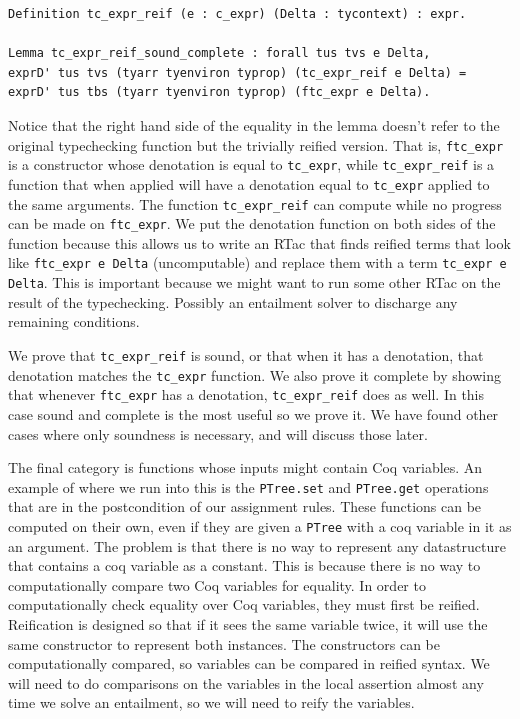 \documentclass{puthesis}
\begin{document}
\begin{lstlisting}
Definition tc_expr_reif (e : c_expr) (Delta : tycontext) : expr.

Lemma tc_expr_reif_sound_complete : forall tus tvs e Delta,
exprD' tus tvs (tyarr tyenviron typrop) (tc_expr_reif e Delta) =
exprD' tus tbs (tyarr tyenviron typrop) (ftc_expr e Delta).
\end{lstlisting}

Notice that the right hand side of the equality in the lemma doesn't
refer to the original typechecking function but the trivially reified
version. That is, \lstinline|ftc_expr| is a constructor whose
denotation is equal to \lstinline|tc_expr|, while
\lstinline|tc_expr_reif| is a function that when applied will have a
denotation equal to \lstinline|tc_expr| applied to the same
arguments. The function \lstinline|tc_expr_reif| can compute while no
progress can be made on \lstinline|ftc_expr|.  We put the denotation
function on both sides of the function because this allows us to write
an RTac that finds reified terms that look like \lstinline|ftc_expr e Delta|
(uncomputable) and replace them with a term 
\lstinline|tc_expr e Delta|. This is important because we might want to run some other
RTac on the result of the typechecking. Possibly an entailment solver
to discharge any remaining conditions.

We prove that \lstinline|tc_expr_reif| is sound, or that when it has a
denotation, that denotation matches the \lstinline|tc_expr|
function. We also prove it complete by showing that whenever
\lstinline|ftc_expr| has a denotation, \lstinline|tc_expr_reif| does
as well.  In this case sound and complete is the most useful so we
prove it. We have found other cases where only soundness is necessary,
and will discuss those later.

The final category is functions whose inputs might contain Coq
variables. An example of where we run into this is the
\lstinline|PTree.set| and \lstinline|PTree.get| operations that are in
the postcondition of our assignment rules. These functions can be
computed on their own, even if they are given a \lstinline|PTree| with
a coq variable in it as an argument. The problem is that there is no
way to represent any datastructure that contains a coq variable as a
constant. This is because there is no way to computationally compare
two Coq variables for equality. In order to computationally check
equality over Coq variables, they must first be reified.  Reification
is designed so that if it sees the same variable twice, it will use
the same constructor to represent both instances. The constructors can
be computationally compared, so variables can be compared in reified
syntax.  We will need to do comparisons on the variables in the local
assertion almost any time we solve an entailment, so we will need to
reify the variables.
\end{document}
